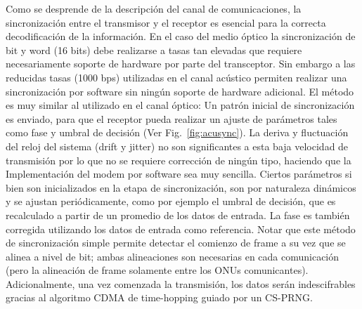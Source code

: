 Como se desprende de la descripción del canal de comunicaciones, la sincronización entre el transmisor y el receptor es esencial para la correcta decodificación de la información. 
En el caso del medio óptico la sincronización de bit y word (16 bits) debe realizarse a tasas tan elevadas que requiere necesariamente soporte de hardware por parte del transceptor.
Sin embargo a las reducidas tasas (1000 bps) utilizadas en el canal acústico permiten realizar una sincronización por software sin ningún soporte de hardware adicional. 
El método es muy similar al utilizado en el canal óptico: Un patrón inicial de sincronización es enviado, para que el receptor pueda realizar un ajuste de parámetros tales como fase y umbral de decisión (Ver Fig.~\ref{fig:acusync}). La deriva y fluctuación del reloj del sistema (drift y jitter) no son significantes a esta baja velocidad de transmisión por lo que no se requiere corrección de ningún tipo, haciendo que la Implementación del modem por software sea muy sencilla.
Ciertos parámetros si bien son inicializados en la etapa de sincronización, son por naturaleza dinámicos y se ajustan periódicamente, como por ejemplo el umbral de decisión, que es recalculado a partir de un promedio de los datos de entrada. La fase es también corregida utilizando los datos de entrada como referencia. Notar que este método de sincronización simple permite detectar el comienzo de frame a su vez que se alinea a nivel de bit; ambas alineaciones son necesarias en cada comunicación (pero la alineación de frame solamente entre los ONUs comunicantes). Adicionalmente, una vez comenzada la transmisión, los datos serán indescifrables gracias al algoritmo CDMA de time-hopping guiado por un CS-PRNG.



